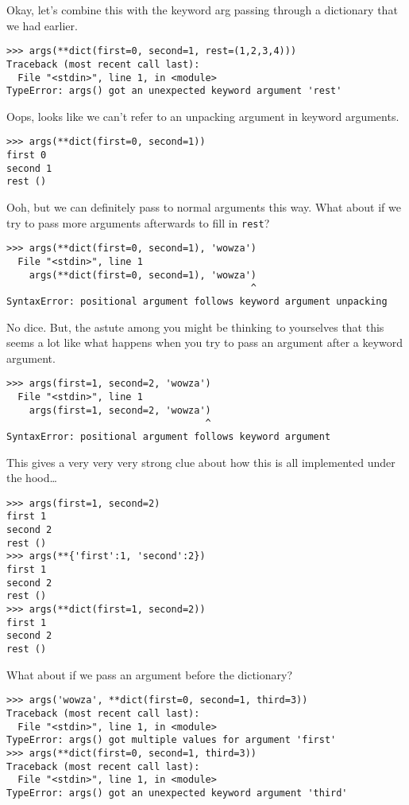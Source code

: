 \documentclass[11pt]{article}
\begin{document}
Okay, let's combine this with the keyword arg passing through a
dictionary that we had earlier.
\begin{verbatim}
>>> args(**dict(first=0, second=1, rest=(1,2,3,4)))
Traceback (most recent call last):
  File "<stdin>", line 1, in <module>
TypeError: args() got an unexpected keyword argument 'rest'
\end{verbatim}
Oops, looks like we can't refer to an unpacking argument in keyword
arguments.
\begin{verbatim}
>>> args(**dict(first=0, second=1))
first 0
second 1
rest ()
\end{verbatim}
Ooh, but we can definitely pass to normal arguments this way. What
about if we try to pass more arguments afterwards to fill in \texttt{rest}?
\begin{verbatim}
>>> args(**dict(first=0, second=1), 'wowza')
  File "<stdin>", line 1
    args(**dict(first=0, second=1), 'wowza')
                                           ^
SyntaxError: positional argument follows keyword argument unpacking
\end{verbatim}
No dice. But, the astute among you might be thinking to
yourselves that this seems a lot like what happens when you try to
pass an argument after a keyword argument.
\begin{verbatim}
>>> args(first=1, second=2, 'wowza')
  File "<stdin>", line 1
    args(first=1, second=2, 'wowza')
                                   ^
SyntaxError: positional argument follows keyword argument
\end{verbatim}
This gives a very very very strong clue about how this is all
implemented under the hood\ldots{}
\begin{verbatim}
>>> args(first=1, second=2)
first 1
second 2
rest ()
>>> args(**{'first':1, 'second':2})
first 1
second 2
rest ()
>>> args(**dict(first=1, second=2))
first 1
second 2
rest ()
\end{verbatim}
What about if we pass an argument before the dictionary?
\begin{verbatim}
>>> args('wowza', **dict(first=0, second=1, third=3))
Traceback (most recent call last):
  File "<stdin>", line 1, in <module>
TypeError: args() got multiple values for argument 'first'
>>> args(**dict(first=0, second=1, third=3))
Traceback (most recent call last):
  File "<stdin>", line 1, in <module>
TypeError: args() got an unexpected keyword argument 'third'
\end{verbatim}
\end{document}
